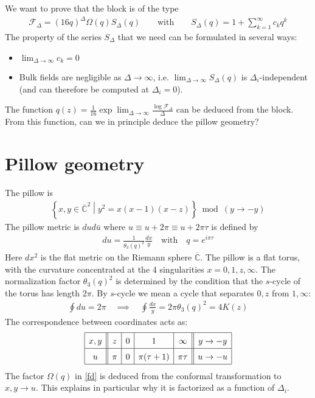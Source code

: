 \documentclass[12pt,a4paper]{article}
\begin{document}
We want to prove that the block is of the type 
\begin{align}
 \mathcal{F}_\Delta = (16q)^\Delta \Omega(q)S_\Delta(q) \qquad \text{with} \qquad S_\Delta(q) =  1 + \sum_{k=1}^\infty c_k q^k 
 \label{fd}
\end{align}
The property of the series $S_\Delta$ that we need can be formulated in several ways:
\begin{itemize}
 \item $\lim_{\Delta\to \infty} c_k = 0$
 \item Bulk fields are negligible as $\Delta\to\infty$, i.e. $\lim_{\Delta\to\infty} S_\Delta(q)$ is $\Delta_i$-independent (and can therefore be computed at $\Delta_i=0$). 
\end{itemize}
The function $q(z)= \frac{1}{16} \exp \lim_{\Delta\to \infty} \frac{\log \mathcal{F}_\Delta}{\Delta}$ can be deduced from the block. From this function, can we in principle deduce the pillow geometry?


\section{Pillow geometry}

The pillow is 
\begin{align}
 \left\{x,y\in \overline{\mathbb{C}}^2\middle| y^2=x(x-1)(x-z) \right\}\bmod (y\to -y)
\end{align}
The pillow metric is $dud\bar u$ where $u\equiv u+2\pi \equiv u+2\pi\tau$ is defined by 
\begin{align}
 du = \frac{1}{\theta_3(q)^2} \frac{dx}{y} \quad \text{with} \quad q=e^{i\pi\tau}
\end{align}
Here $dx^2$ is the flat metric on the Riemann sphere $\overline{\mathbb{C}}$. The pillow is a flat torus, with the curvature concentrated at the 4 singularities $x=0,1,z,\infty$. The normalization factor $\theta_3(q)^2$ is determined by the condition that the $s$-cycle of the torus has length $2\pi$. By $s$-cycle we mean a cycle that separates $0,z$ from $1,\infty$:
\begin{align}
  \oint du = 2\pi \quad \implies \quad \oint \frac{dx}{y} =  2\pi\theta_3(q)^2 = 4K(z)
\end{align}
The correspondence between coordinates acts as:
\begin{align}
\renewcommand{\arraystretch}{1.5}
 \begin{array}{|c||c|c|c|c||c|}
 \hline 
  x,y & z & 0 & 1 & \infty & y\to -y 
  \\
  \hline 
   u &  \pi & 0 & \pi(\tau+1) & \pi\tau & u \to -u
   \\
   \hline 
 \end{array}
\end{align}
The factor $\Omega(q)$ in \eqref{fd} is deduced from the conformal transformation to $x,y\to u$. This explains in particular why it is factorized as a function of $\Delta_i$. 
\end{document}
